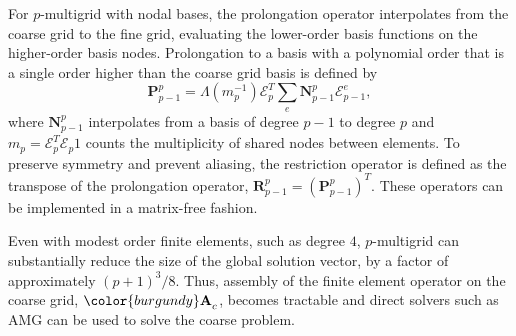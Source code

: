 For $p$-multigrid with nodal bases, the prolongation operator interpolates from the coarse grid to the fine grid, evaluating the lower-order basis functions on the higher-order basis nodes.
Prolongation to a basis with a polynomial order that is a single order higher than the coarse grid basis is defined by
\begin{equation}
\mathbf{P}_{p - 1}^p = \Lambda \left( m_p^{-1} \right) \mathcal{E}_p^T \sum_e \mathbf{N}_{p - 1}^p \mathcal{E}^e_{p - 1},
\label{mg_prolong}
\end{equation}
where $\mathbf{N}_{p - 1}^p$ interpolates from a basis of degree $p - 1$ to degree $p$ and $m_p = \mathcal{E}_p^T \mathcal{E}_p 1$ counts the multiplicity of shared nodes between elements.
To preserve symmetry and prevent aliasing, the restriction operator is defined as the transpose of the prolongation operator, $\mathbf{R}_{p - 1}^p = \left( \mathbf{P}_{p - 1}^p \right)^T$.
These operators can be implemented in a matrix-free fashion.

Even with modest order finite elements, such as degree $4$, $p$-multigrid can substantially reduce the size of the global solution vector, by a factor of approximately $\left( p + 1 \right)^3 / 8$.
Thus, assembly of the finite element operator on the coarse grid, ${\color{burgundy}\mathbf{A}}_c$, becomes tractable and direct solvers such as AMG can be used to solve the coarse problem.